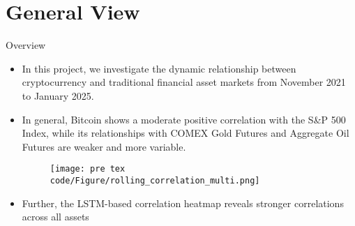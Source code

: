 \section{General View}
    \begin{frame}{Overview}
    \begin{itemize}
     \item<1-> In this project, we investigate the dynamic relationship between cryptocurrency and traditional financial asset markets from November 2021 to January 2025.
     \item<2-> In general, Bitcoin shows a moderate positive correlation with the S\&P 500 Index, while its relationships with COMEX Gold Futures and Aggregate Oil Futures are weaker and more variable.
      {\begin{figure}[h]\texttt{[image: pre tex code/Figure/rolling\_correlation\_multi.png]}\end{figure}}
     \item<3> Further, the LSTM-based correlation heatmap reveals stronger correlations across all assets
     
    \end{itemize}
    \end{frame}
    
 
 